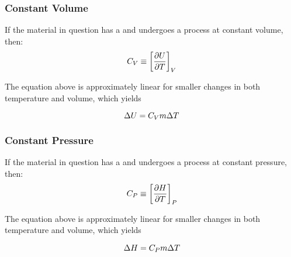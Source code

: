 \subsubsection{Constant Volume}\label{subsubsec:Specific_Heat_Constant_Volume}
If the material in question has a  and undergoes a process at constant volume, then:
\begin{equation*}
  C_{V} \equiv {\left[ \frac{\partial \ensuremath{U}}{\partial \ensuremath{T}} \right]}_{V}
\end{equation*}

The equation above is approximately linear for smaller changes in both temperature and volume, which yields 

\begin{equation}\label{eq:Change_Internal_Energy_Specific_Heat_Constant_Volume}
  \Delta U = C_{V} m \Delta T
\end{equation}

\subsubsection{Constant Pressure}\label{subsubsec:Specific_Heat_Constant_Pressure}
If the material in question has a  and undergoes a process at constant pressure, then:
\begin{equation*}
  C_{P} \equiv {\left[ \frac{\partial \ensuremath{H}}{\partial \ensuremath{T}} \right]}_{P}
\end{equation*}

The equation above is approximately linear for smaller changes in both temperature and volume, which yields 

\begin{equation}\label{eq:Change_Internal_Energy_Specific_Heat_Constant_Pressure}
  \Delta H = C_{P} m \Delta T
\end{equation}


